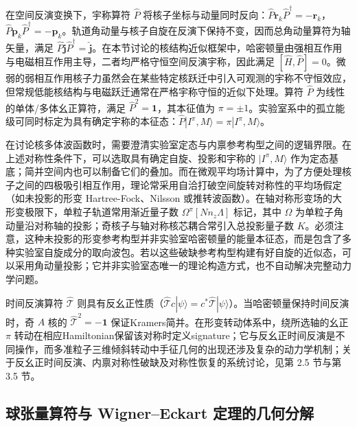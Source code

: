 在空间反演变换下，宇称算符 $\hat{P}$ 将核子坐标与动量同时反向：$\hat{P} \mathbf{r}_k \hat{P}^\dagger = -\mathbf{r}_k$，$\hat{P} \mathbf{p}_k \hat{P}^\dagger = -\mathbf{p}_k$。轨道角动量与核子自旋在反演下保持不变，因而总角动量算符为轴矢量，满足 $\hat{P} \hat{\mathbf{j}} \hat{P}^\dagger = \hat{\mathbf{j}}$。在本节讨论的核结构近似框架中，哈密顿量由强相互作用与电磁相互作用主导，二者均严格守恒空间反演宇称，因此满足 $[\hat{H}, \hat{P}] = 0$。微弱的弱相互作用核子力虽然会在某些特定核跃迁中引入可观测的宇称不守恒效应，但常规低能核结构与电磁跃迁通常在严格宇称守恒的近似下处理。算符 $\hat{P}$ 为线性的单体/多体幺正算符，满足 $\hat{P}^2 = \mathbf{1}$，其本征值为 $\pi = \pm 1$。实验室系中的孤立能级可同时标定为具有确定宇称的本征态：$\hat{P} |I^\pi, M\rangle = \pi |I^\pi, M\rangle$。

在讨论核多体波函数时，需要澄清实验室定态与内禀参考构型之间的逻辑界限。在上述对称性条件下，可以选取具有确定自旋、投影和宇称的 $|I^\pi,M\rangle$ 作为定态基底；简并空间内也可以制备它们的叠加。而在微观平均场计算中，为了方便处理核子之间的四极吸引相互作用，理论常采用自洽打破空间旋转对称性的平均场假定（如未投影的形变 Hartree-Fock、Nilsson 或推转波函数）。在轴对称形变场的大形变极限下，单粒子轨道常用渐近量子数 $\Omega^\pi [N n_z \Lambda]$ 标记，其中 $\Omega$ 为单粒子角动量沿对称轴的投影；奇核子与轴对称核芯耦合常引入总投影量子数 $K$。必须注意，这种未投影的形变参考构型并非实验室哈密顿量的能量本征态，而是包含了多种实验室自旋成分的取向波包。若以这些破缺参考构型构建有好自旋的近似态，可以采用角动量投影；它并非实验室态唯一的理论构造方式，也不自动解决完整动力学问题。

时间反演算符 $\hat{\mathcal{T}}$ 则具有反幺正性质（$\hat{\mathcal{T}} c |\psi\rangle = c^* \hat{\mathcal{T}} |\psi\rangle$）。当哈密顿量保持时间反演时，奇 $A$ 核的 $\hat{\mathcal{T}}^2=-\mathbf{1}$ 保证Kramers简并。在形变转动体系中，绕所选轴的幺正 $\pi$ 转动在相应Hamiltonian保留该对称时定义signature；它与反幺正时间反演是不同操作，而多准粒子三维倾斜转动中手征几何的出现还涉及复杂的动力学机制；关于反幺正时间反演、内禀对称性破缺及对称性恢复的系统讨论，见第 2.5 节与第 3.5 节。



\subsection{球张量算符与 Wigner–Eckart 定理的几何分解}\label{sec:2-1-2}


